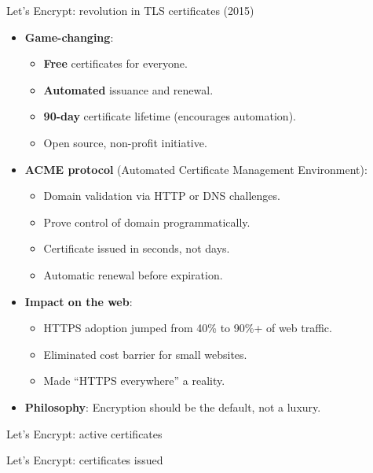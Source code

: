 \documentclass[aspectratio=169, lualatex,  10pt,dvipsnames,svgnames]{beamer} %
\begin{document}
\begin{frame}{Let's Encrypt: revolution in TLS certificates (2015)}
	\begin{itemize}
		\item \textbf{Game-changing}:
		      \begin{itemize}
			      \item \textbf{Free} certificates for everyone.
			      \item \textbf{Automated} issuance and renewal.
			      \item \textbf{90-day} certificate lifetime (encourages automation).
			      \item Open source, non-profit initiative.\pause
		      \end{itemize}
		\item \textbf{ACME protocol} (Automated Certificate Management Environment):
		      \begin{itemize}
			      \item Domain validation via HTTP or DNS challenges.
			      \item Prove control of domain programmatically.
			      \item Certificate issued in seconds, not days.
			      \item Automatic renewal before expiration.\pause
		      \end{itemize}
		\item \textbf{Impact on the web}:
		      \begin{itemize}
			      \item HTTPS adoption jumped from 40\% to 90\%+ of web traffic.
			      \item Eliminated cost barrier for small websites.
			      \item Made ``HTTPS everywhere'' a reality.\pause
		      \end{itemize}
		\item \textbf{Philosophy}: Encryption should be the default, not a luxury.
	\end{itemize}
\end{frame}

\begin{frame}{Let's Encrypt: active certificates}
\end{frame}

\begin{frame}{Let's Encrypt: certificates issued}
\end{frame}
\end{document}
